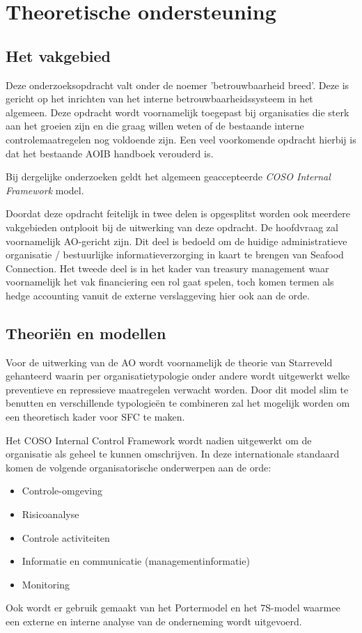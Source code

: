 \documentclass[10pt,a4paper,oneside]{report}
\begin{document}
\section{Theoretische ondersteuning}
\subsection{Het vakgebied}
Deze onderzoeksopdracht valt onder de noemer 'betrouwbaarheid breed'. Deze is gericht op het inrichten van het interne betrouwbaarheidssysteem in het algemeen. Deze opdracht wordt voornamelijk toegepast bij organisaties die sterk aan het groeien zijn en die graag willen weten of de bestaande interne controlemaatregelen nog voldoende zijn. Een veel voorkomende opdracht hierbij is dat het bestaande AOIB handboek verouderd is. \citep{bivpraktijk}

Bij dergelijke onderzoeken geldt het algemeen geaccepteerde \textit{COSO Internal Framework} model.

Doordat deze opdracht feitelijk in twee delen is opgesplitst worden ook meerdere vakgebieden ontplooit bij de uitwerking van deze opdracht. De hoofdvraag zal voornamelijk AO-gericht zijn. Dit deel is bedoeld om de huidige administratieve organisatie / bestuurlijke informatieverzorging in kaart te brengen van Seafood Connection. Het tweede deel is in het kader van treasury management waar voornamelijk het vak financiering een rol gaat spelen, toch komen termen als hedge accounting vanuit de externe verslaggeving hier ook aan de orde.

\subsection{Theoriën en modellen}
Voor de uitwerking van de AO wordt voornamelijk de theorie van Starreveld gehanteerd waarin per organisatietypologie onder andere wordt uitgewerkt welke preventieve en repressieve maatregelen verwacht worden. Door dit model slim te benutten en verschillende typologieën te combineren zal het mogelijk worden om een theoretisch kader voor SFC te maken. 

Het COSO Internal Control Framework wordt nadien uitgewerkt om de organisatie als geheel te kunnen omschrijven. In deze internationale standaard komen de volgende organisatorische onderwerpen aan de orde:
\begin{itemize}
    \item Controle-omgeving
    \item Risicoanalyse
    \item Controle activiteiten
    \item Informatie en communicatie (managementinformatie)
    \item Monitoring
\end{itemize}
Ook wordt er gebruik gemaakt van het Portermodel en het 7S-model waarmee een externe en interne analyse van de onderneming wordt uitgevoerd.
\end{document}
